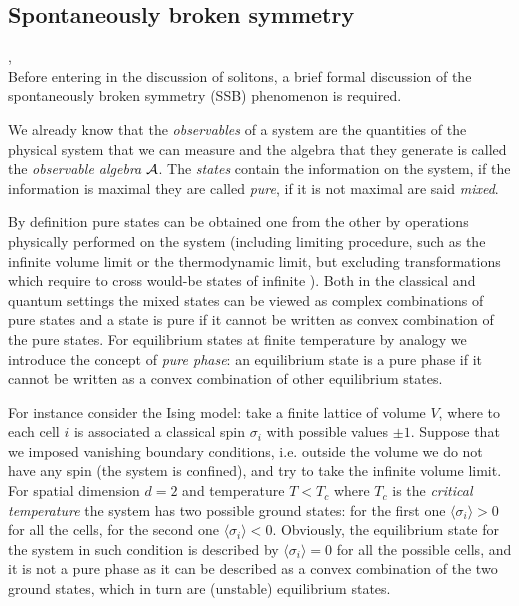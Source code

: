\documentclass[../main/main.tex]{subfiles}
\begin{document}
\subsection{Spontaneously broken symmetry}

\cite[Chapter C.1]{Strocchi_1985}, \cite{Strocchi:2012}\\

Before entering in the discussion of solitons, a brief formal discussion of the spontaneously broken symmetry (SSB) phenomenon is required. 

We already know that the \emph{observables} of a system are the quantities of the physical system that we can measure and the algebra that they generate is called the \emph{observable algebra} $\mathcal A$. The \emph{states} contain the information on the system, if the information is maximal they are called \emph{pure}, if it is not maximal are said \emph{mixed}. 

By definition pure states can be obtained one from the other by operations physically performed on the system (including limiting procedure, such as the infinite volume limit or the thermodynamic limit, but excluding transformations which require to cross would-be states of infinite ). Both in the classical and quantum settings the mixed states can be viewed as complex combinations of pure states and a state is pure if it cannot be written as convex combination of the pure states. 
For equilibrium states at finite temperature by analogy we introduce the concept of \emph{pure phase}: an equilibrium state is a pure phase if it cannot be written as a convex combination of other equilibrium states.

\skipline

For instance consider the Ising model: take a finite lattice of volume $V$, where to each cell $i$ is associated a classical spin $\sigma_i$ with possible values $\pm1$. Suppose that we imposed vanishing boundary conditions, i.e. outside the volume we do not have any spin (the system is confined), and try to take the infinite volume limit. For spatial dimension $d=2$ and temperature $T<T_c$ where $T_c$ is the \emph{critical temperature} the system has two possible ground states: for the first one $\langle\sigma_i\rangle>0$ for all the cells, for the second one $\langle\sigma_i\rangle<0$. Obviously, the equilibrium state for the system in such condition is described by $\langle\sigma_i\rangle =0$ for all the possible cells, and it is not a pure phase as it can be described as a convex combination of the two ground states, which in turn are (unstable) equilibrium states. 
\end{document}
